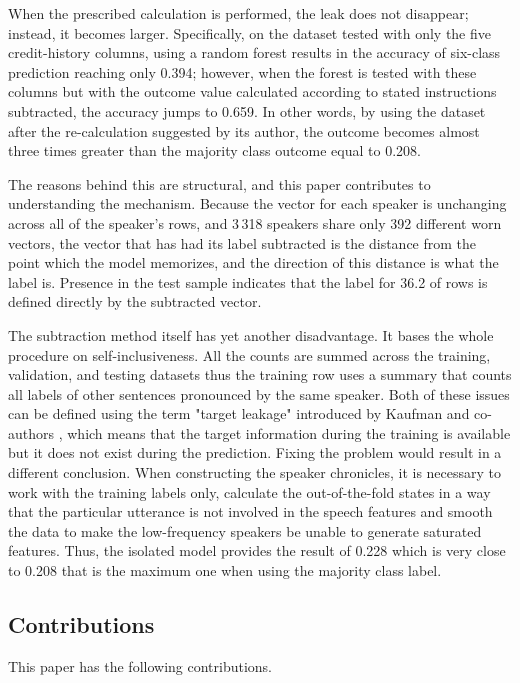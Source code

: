When the prescribed calculation is performed, the leak does not disappear; instead, it becomes larger. Specifically, on the dataset tested with only the five credit-history columns, using a random forest results in the accuracy of six-class prediction reaching only 0.394; however, when the forest is tested with these columns but with the outcome value calculated according to stated instructions subtracted, the accuracy jumps to 0.659. In other words, by using the dataset after the re-calculation suggested by its author, the outcome becomes almost three times greater than the majority class outcome equal to 0.208.

The reasons behind this are structural, and this paper contributes to understanding the mechanism. Because the vector for each speaker is unchanging across all of the speaker's rows, and 3\,318 speakers share only 392 different worn vectors, the vector that has had its label subtracted is the distance from the point which the model memorizes, and the direction of this distance is what the label is. Presence in the test sample indicates that the label for 36.2 of rows is defined directly by the subtracted vector.

The subtraction method itself has yet another disadvantage. It bases the whole procedure on self-inclusiveness. All the counts are summed across the training, validation, and testing datasets thus the training row uses a summary that counts all labels of other sentences pronounced by the same speaker. Both of these issues can be defined using the term "target leakage" introduced by Kaufman and co-authors \cite{kaufman2012leakage}, which means that the target information during the training is available but it does not exist during the prediction. Fixing the problem would result in a different conclusion. When constructing the speaker chronicles, it is necessary to work with the training labels only, calculate the out-of-the-fold states in a way that the particular utterance is not involved in the speech features and smooth the data to make the low-frequency speakers be unable to generate saturated features. Thus, the isolated model provides the result of 0.228 which is very close to 0.208 that is the maximum one when using the majority class label.

\subsection{Contributions}

This paper has the following contributions.

